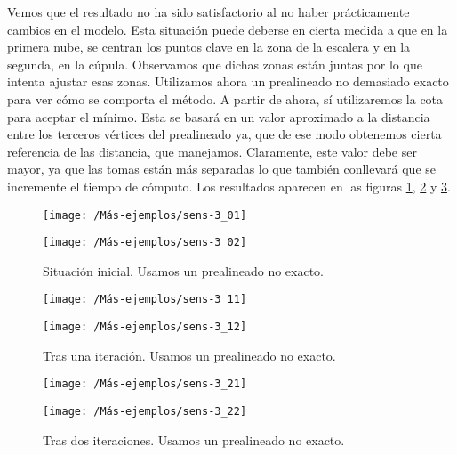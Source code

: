Vemos que el resultado no ha sido satisfactorio al no haber prácticamente cambios en el modelo. Esta situación puede deberse en cierta medida a que en la primera nube, se centran los puntos clave en la zona de la escalera y en la segunda, en la cúpula. Observamos que dichas zonas están juntas por lo que intenta ajustar esas zonas. Utilizamos ahora un prealineado no demasiado exacto para ver cómo se comporta el método.  A partir de ahora, sí utilizaremos la cota para aceptar el mínimo. Esta se basará en un valor aproximado a la distancia entre los terceros vértices del prealineado ya, que de ese modo obtenemos cierta referencia de las distancia, que manejamos. Claramente, este valor debe ser mayor, ya que las tomas están más separadas lo que también conllevará que se incremente el tiempo de cómputo. Los resultados aparecen en las figuras \ref{fig:sensi-2-1}, \ref{fig:sensi-2-2} y \ref{fig:sensi-2-3}.\\

\begin{figure}[h!]	
	\begin{minipage}[b]{0.5\textwidth}
		\centering		
		\texttt{[image: /Más-ejemplos/sens-3\_01]} 
	\end{minipage}
	\begin{minipage}[b]{0.5\textwidth}
		\centering
		\texttt{[image: /Más-ejemplos/sens-3\_02]}
	\end{minipage}	
	\caption{Situación inicial. Usamos un prealineado no exacto.}
	\label{fig:sensi-2-1}
\end{figure}
\begin{figure}[h!]	
	\begin{minipage}[b]{0.5\textwidth}
		\centering		
		\texttt{[image: /Más-ejemplos/sens-3\_11]} 
	\end{minipage}
	\begin{minipage}[b]{0.5\textwidth}
		\centering
		\texttt{[image: /Más-ejemplos/sens-3\_12]}
	\end{minipage}	
	\caption{Tras una iteración. Usamos un prealineado no exacto.}
	\label{fig:sensi-2-2}
\end{figure}

\begin{figure}[h!]	
	\begin{minipage}[b]{0.5\textwidth}
		\centering		
		\texttt{[image: /Más-ejemplos/sens-3\_21]} 
	\end{minipage}
	\begin{minipage}[b]{0.5\textwidth}
		\texttt{[image: /Más-ejemplos/sens-3\_22]}
	\end{minipage}	
	\caption{Tras dos iteraciones. Usamos un prealineado no exacto.}
	\label{fig:sensi-2-3}
\end{figure}

